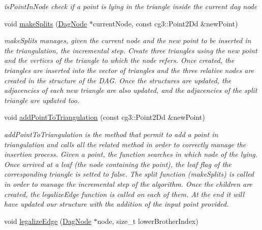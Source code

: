 \begin{DoxyCompactItemize}
\begin{DoxyCompactList}\small\item\em is\+Point\+In\+Node check if a point is lying in the triangle inside the current dag node \end{DoxyCompactList}\item 
void \hyperlink{classDelauneyTriangulation_a30d7b8239f8317887052a4f3046c48af}{make\+Splits} (\hyperlink{classDagNode}{Dag\+Node} $\ast$current\+Node, const cg3\+::\+Point2\+Dd \&new\+Point)
\begin{DoxyCompactList}\small\item\em make\+Splits manages, given the current node and the new point to be inserted in the triangulation, the incremental step. Create three triangles using the new point and the vertices of the triangle to which the node refers. Once created, the triangles are inserted into the vector of triangles and the three relative nodes are created in the structure of the D\+AG. Once the structures are updated, the adjacencies of each new triangle are also updated, and the adjacencies of the split triangle are updated too. \end{DoxyCompactList}\item 
void \hyperlink{classDelauneyTriangulation_a7f41dfc218c0fdf3454e8360e6aaf115}{add\+Point\+To\+Triangulation} (const cg3\+::\+Point2\+Dd \&new\+Point)
\begin{DoxyCompactList}\small\item\em add\+Point\+To\+Triangulation is the method that permit to add a point in triangulation and calls all the related method in order to correctly manage the insertion process. Given a point, the function searches in which node of the lying. Once arrived at a leaf (the node containing the point), the leaf flag of the corresponding triangle is setted to false. The split function (make\+Splits) is called in order to manage the incremental step of the algorithm. Once the children are created, the legalize\+Edge function is called on each of them. At the end it will have updated our structure with the addition of the input point provided. \end{DoxyCompactList}\item 
void \hyperlink{classDelauneyTriangulation_a0864810211f778b5e8fc0ae67825e158}{legalize\+Edge} (\hyperlink{classDagNode}{Dag\+Node} $\ast$node, size\+\_\+t lower\+Brother\+Index)

\end{DoxyCompactItemize}
